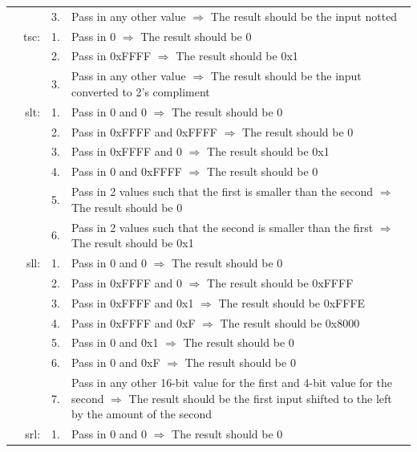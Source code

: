 \documentclass{article}
\begin{document}
\begin{longtable}{ r r r p{11cm} }
				                &      & 3. & Pass in any other value $\Rightarrow$ The result should be the input notted\\
				                & tsc: & 1. & Pass in 0 $\Rightarrow$ The result should be 0\\
				                &      & 2. & Pass in 0xFFFF $\Rightarrow$ The result should be 0x1\\
				                &      & 3. & Pass in any other value $\Rightarrow$ The result should be the input converted to 2's compliment\\
				                & slt: & 1. & Pass in 0 and 0 $\Rightarrow$ The result should be 0\\
				                &      & 2. & Pass in 0xFFFF and 0xFFFF $\Rightarrow$ The result should be 0\\
				                &      & 3. & Pass in 0xFFFF and 0 $\Rightarrow$ The result should be 0x1\\
				                &      & 4. & Pass in 0 and 0xFFFF $\Rightarrow$ The result should be 0\\
				                &      & 5. & Pass in 2 values such that the first is smaller than the second $\Rightarrow$ The result should be 0\\
				                &      & 6. & Pass in 2 values such that the second is smaller than the first $\Rightarrow$ The result should be 0x1\\
				                & sll: & 1. & Pass in 0 and 0 $\Rightarrow$ The result should be 0\\
				                &      & 2. & Pass in 0xFFFF and 0 $\Rightarrow$ The result should be 0xFFFF\\
				                &      & 3. & Pass in 0xFFFF and 0x1 $\Rightarrow$ The result should be 0xFFFE\\
				                &      & 4. & Pass in 0xFFFF and 0xF $\Rightarrow$ The result should be 0x8000\\
				                &      & 5. & Pass in 0 and 0x1 $\Rightarrow$ The result should be 0\\
				                &      & 6. & Pass in 0 and 0xF $\Rightarrow$ The result should be 0\\
				                &      & 7. & Pass in any other 16-bit value for the first and 4-bit value for the second $\Rightarrow$ The result should be the first input shifted to the left by the amount of the second\\
				                & srl: & 1. & Pass in 0 and 0 $\Rightarrow$ The result should be 0\\

\end{longtable}
\end{document}
